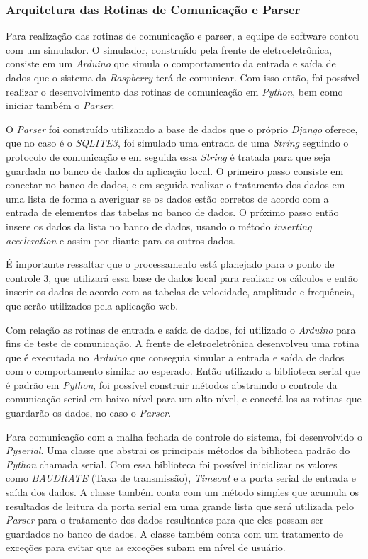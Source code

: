 \subsubsection*{\textbf{Arquitetura das Rotinas de Comunicação e Parser}}

Para realização das rotinas de comunicação e parser, a equipe de software contou com um simulador. O simulador, construído pela frente de eletroeletrônica, 
consiste em um \textit{Arduino} que simula o comportamento da entrada e saída de dados que o sistema da \textit{Raspberry} terá de comunicar. Com isso 
então, foi possível realizar o desenvolvimento das rotinas de comunicação em \textit{Python}, bem como iniciar também o \textit{Parser}.

O \textit{Parser} foi construído utilizando a base de dados que o próprio \textit{Django} oferece, que no caso é o \textit{SQLITE3}, foi simulado uma 
entrada de uma \textit{String} seguindo o protocolo de comunicação e em seguida essa \textit{String} é tratada para que seja guardada no banco de dados 
da aplicação local. O primeiro passo consiste em conectar no banco de dados, e em seguida realizar o tratamento dos dados em uma lista de forma a 
averiguar se os dados estão corretos de acordo com a entrada de elementos das tabelas no banco de dados. O próximo passo então insere os dados da lista 
no banco de dados, usando o método \textit{inserting acceleration} e assim por diante para os outros dados.

É importante ressaltar que o processamento está planejado para o ponto de controle 3, que utilizará essa base de dados local para realizar os cálculos 
e então inserir os dados de acordo com as tabelas de velocidade, amplitude e frequência, que serão utilizados pela aplicação web.

Com relação as rotinas de entrada e saída de dados, foi utilizado o \textit{Arduino} para fins de teste de comunicação. A frente de eletroeletrônica 
desenvolveu uma rotina que é executada no \textit{Arduino} que conseguia simular a entrada e saída de dados com o comportamento similar ao esperado. 
Então utilizado a biblioteca serial que é padrão em \textit{Python}, foi possível construir métodos abstraindo o controle da comunicação serial em baixo
nível para um alto nível, e conectá-los as rotinas que guardarão os dados, no caso o \textit{Parser}.

Para comunicação com a malha fechada de controle do sistema, foi desenvolvido o \textit{Pyserial}. Uma classe que abstrai os principais métodos da 
biblioteca padrão do \textit{Python} chamada serial. Com essa biblioteca foi possível inicializar os valores como \textit{BAUDRATE} (Taxa de transmissão),
\textit{Timeout} e a porta serial de entrada e saída dos dados. A classe também conta com um método simples que acumula os resultados de leitura da porta 
serial em uma grande lista que será utilizada pelo \textit{Parser} para o tratamento dos dados resultantes para que eles possam ser guardados no banco de 
dados. A classe também conta com um tratamento de exceções para evitar que as exceções subam em nível de usuário.

